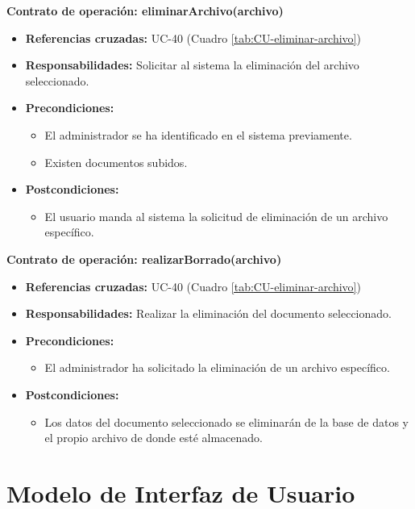 \textbf{Contrato de operación: eliminarArchivo(archivo)}
\begin{itemize}
\item \textbf{Referencias cruzadas:} UC-40 (Cuadro \ref{tab:CU-eliminar-archivo})
\item \textbf{Responsabilidades:} Solicitar al sistema la eliminación del archivo seleccionado.
\item \textbf{Precondiciones:} 
 \begin{itemize}
\item El administrador se ha identificado en el sistema previamente.
\item Existen documentos subidos.
\end {itemize}
\item \textbf{Postcondiciones:} 
 \begin{itemize}
\item El usuario manda al sistema la solicitud de eliminación de un archivo específico.
\end {itemize}
\end {itemize}

\textbf{Contrato de operación: realizarBorrado(archivo)}
\begin{itemize}
\item \textbf{Referencias cruzadas:} UC-40 (Cuadro \ref{tab:CU-eliminar-archivo})
\item \textbf{Responsabilidades:} Realizar la eliminación del documento seleccionado.
\item \textbf{Precondiciones:} 
 \begin{itemize}
\item El administrador ha solicitado la eliminación de un archivo específico.
\end {itemize}
\item \textbf{Postcondiciones:} 
 \begin{itemize}
\item Los datos del documento seleccionado se eliminarán de la base de datos y el propio archivo de donde esté almacenado.
\end {itemize}
\end {itemize}


\vspace{7mm}
\dotfill
\vspace{7mm}


\section{Modelo de Interfaz de Usuario}

